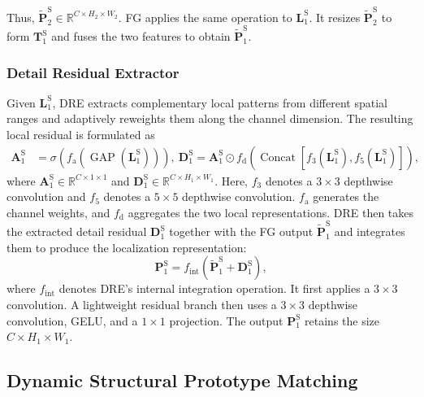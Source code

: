 \documentclass[runningheads]{llncs}
\begin{document}
Thus, $\widetilde{\mathbf{P}}_{2}^{\mathrm{S}} \in\mathbb{R}^{C\times H_2\times W_2}$. FG applies the same operation to $\mathbf{L}_{1}^{\mathrm{S}}$. It resizes $\widetilde{\mathbf{P}}_{2}^{\mathrm{S}}$ to form $\mathbf{T}_{1}^{\mathrm{S}}$ and fuses the two features to obtain $\widetilde{\mathbf{P}}_{1}^{\mathrm{S}}$.

\subsubsection{Detail Residual Extractor}

Given $\mathbf{L}_{1}^{\mathrm{S}}$, DRE extracts complementary local patterns from different spatial ranges and adaptively reweights them along the channel dimension. The resulting local residual is formulated as
\begin{equation}
\begin{aligned}
\mathbf{A}_{1}^{\mathrm{S}}
&=
\sigma\!\left(
f_{\mathrm{a}}\!\left(
\operatorname{GAP}(\mathbf{L}_{1}^{\mathrm{S}})
\right)\right),\
\mathbf{D}_{1}^{\mathrm{S}}
=
\mathbf{A}_{1}^{\mathrm{S}}
\odot
f_{\mathrm{d}}\!\left(
\operatorname{Concat}\!\left[
f_{3}(\mathbf{L}_{1}^{\mathrm{S}}),
f_{5}(\mathbf{L}_{1}^{\mathrm{S}})
\right]\right),
\end{aligned}
\label{eq:detail_residual}
\end{equation}
where $\mathbf{A}_{1}^{\mathrm{S}}\in\mathbb{R}^{C\times1\times1}$ and $\mathbf{D}_{1}^{\mathrm{S}}\in\mathbb{R}^{C\times H_1\times W_1}$. Here, $f_{3}$ denotes a $3\times3$ depthwise convolution and $f_{5}$ denotes a $5\times5$ depthwise convolution. $f_{\mathrm{a}}$ generates the channel weights, and $f_{\mathrm{d}}$ aggregates the two local representations. DRE then takes the extracted detail residual $\mathbf{D}_{1}^{\mathrm{S}}$ together with the FG output $\widetilde{\mathbf{P}}_{1}^{\mathrm{S}}$ and integrates them to produce the localization representation:
\begin{equation}
\mathbf{P}_{1}^{\mathrm{S}}
=
f_{\mathrm{int}}\!\left(
\widetilde{\mathbf{P}}_{1}^{\mathrm{S}}
+
\mathbf{D}_{1}^{\mathrm{S}}
\right),
\label{eq:dre_output}
\end{equation}
where $f_{\mathrm{int}}$ denotes DRE's internal integration operation.
It first applies a $3\times3$ convolution. A lightweight residual branch then uses a $3\times3$ depthwise convolution, GELU, and a $1\times1$ projection. The output $\mathbf{P}_{1}^{\mathrm{S}}$ retains the size
$C\times H_1\times W_1$.

\subsection{Dynamic Structural Prototype Matching}
\end{document}
